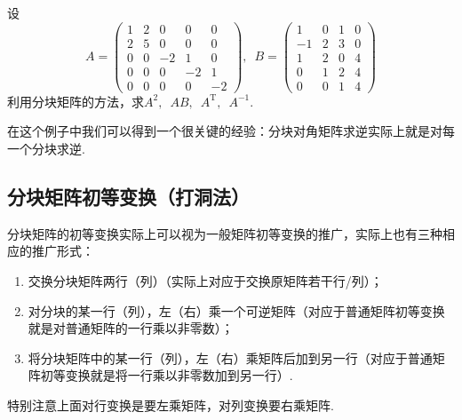 \begin{example}
    设\[A=\begin{pmatrix}
            1 & 2 & 0  & 0  & 0  \\
            2 & 5 & 0  & 0  & 0  \\
            0 & 0 & -2 & 1  & 0  \\
            0 & 0 & 0  & -2 & 1  \\
            0 & 0 & 0  & 0  & -2
        \end{pmatrix},\enspace B=\begin{pmatrix}
            1  & 0 & 1 & 0 \\
            -1 & 2 & 3 & 0 \\
            1  & 2 & 0 & 4 \\
            0  & 1 & 2 & 4 \\
            0  & 0 & 1 & 4
        \end{pmatrix}\]
    利用分块矩阵的方法，求$A^2,\enspace AB,\enspace A^\mathrm{T},\enspace A^{-1}$.
\end{example}

\begin{solution}

\end{solution}

在这个例子中我们可以得到一个很关键的经验：分块对角矩阵求逆实际上就是对每一个分块求逆.

\subsection{分块矩阵初等变换（打洞法）}

分块矩阵的初等变换实际上可以视为一般矩阵初等变换的推广，实际上也有三种相应的推广形式：
\begin{enumerate}
    \item 交换分块矩阵两行（列）（实际上对应于交换原矩阵若干行/列）；

    \item 对分块的某一行（列），左（右）乘一个可逆矩阵（对应于普通矩阵初等变换就是对普通矩阵的一行乘以非零数）；

    \item 将分块矩阵中的某一行（列），左（右）乘矩阵后加到另一行（对应于普通矩阵初等变换就是将一行乘以非零数加到另一行）.
\end{enumerate}
特别注意上面对行变换是要左乘矩阵，对列变换要右乘矩阵.

